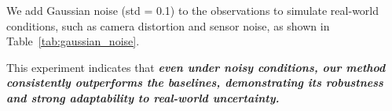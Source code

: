 We add Gaussian noise (std = 0.1) to the observations to simulate real-world conditions, such as camera distortion and sensor noise, as shown in Table~\ref{tab:gaussian_noise}. 

This experiment indicates that \textbf{\textit{even under noisy conditions, our method consistently outperforms the baselines, demonstrating its robustness and strong adaptability to real-world uncertainty.}}